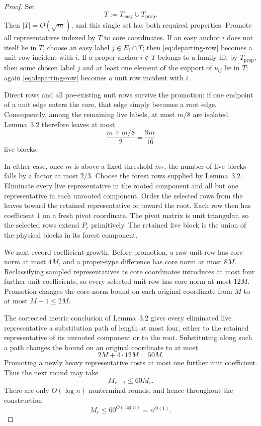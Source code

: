 \documentclass[10pt]{article}
\theoremstyle{definition}
\begin{document}
\begin{proof}
Set
\[
    T:=T_{\mathrm{easy}}\cup T_{\mathrm{prop}}.
\]
Then $|T|=O(\sqrt m)$, and this single set has both required properties.
Promote all representatives indexed by $T$ to core coordinates.  If an easy
anchor $i$ does not itself lie in $T$, choose an easy label $j\in E_i\cap T$;
then \eqref{eq:departing-row} becomes a unit row incident with $i$.  If a proper anchor
$i\notin T$ belongs to a family hit by $T_{\mathrm{prop}}$, then some chosen
label $j$ and at least one element of the support of $\nu_{ij}$ lie in $T$;
again \eqref{eq:departing-row} becomes a unit row incident with $i$.

Direct rows and all pre-existing unit rows survive the promotion: if one
endpoint of a unit edge enters the core, that edge simply becomes a root
edge.  Consequently, among the remaining live labels, at most $m/8$ are
isolated.  Lemma~3.2 therefore leaves at most
\[
    \frac{m+m/8}{2}=\frac{9m}{16}
\]
live blocks.

In either case, once $m$ is above a fixed threshold $m_*$, the number of live
blocks falls by a factor at most $2/3$.  Choose the forest rows supplied by
Lemma~3.2.  Eliminate every live representative in the rooted component and
all but one representative in each unrooted component.  Order the selected
rows from the leaves toward the retained representative or toward the root.
Each row then has coefficient $1$ on a fresh pivot coordinate.  The pivot
matrix is unit triangular, so the selected rows extend $P_r$ primitively.
The retained live block is the union of the physical blocks in its forest
component.

We next record coefficient growth.  Before promotion, a raw unit row has
core norm at most $4M$, and a proper-type difference has core norm at most
$8M$.  Reclassifying sampled representatives as core coordinates introduces
at most four further unit coefficients, so every selected unit row has core
norm at most $12M$.  Promotion changes the core-norm bound on each original
coordinate from $M$ to at most $M+1\le2M$.

The corrected metric conclusion of Lemma~3.2 gives every eliminated live
representative a substitution path of length at most four, either to the
retained representative of its unrooted component or to the root.  Substituting
along such a path changes the bound on an original coordinate to at most
\[
    2M+4\cdot12M=50M.
\]
Promoting a newly heavy representative costs at most one further unit
coefficient.  Thus the next round may take
\[
    M_{r+1}\le60M_r.
\]
There are only $O(\log n)$ nonterminal rounds, and hence throughout the
construction
\[
    M_r\le60^{O(\log n)}=n^{O(1)}.
\]


\end{proof}
\end{document}
